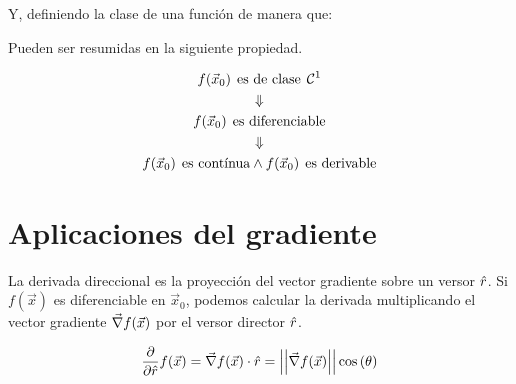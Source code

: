Y, definiendo la clase de una función de manera que:
\begin{mdframed}[style=DefinitionFrame]
    \begin{defn}
    \end{defn}
\end{mdframed}

Pueden ser resumidas en la siguiente propiedad.

\begin{mdframed}[style=PropertyFrame]
    \begin{prop}
    \end{prop}
    \begin{gather*}
        f(\Vec{x}_0) \hspace{1ex} \textrm{es de clase} \hspace{1ex} \mathcal{C}^{1}
        \\
        \Downarrow
        \\
        f(\Vec{x}_0) \hspace{1ex} \textrm{es diferenciable}
        \\
        \Downarrow
        \\
        f(\Vec{x}_0) \hspace{1ex} \textrm{es contínua}
        \land
        f(\Vec{x}_0) \hspace{1ex} \textrm{es derivable}
    \end{gather*}
\end{mdframed}


\section{Aplicaciones del gradiente}

La derivada direccional es la proyección del vector gradiente sobre un versor $\hat{r}$.
Si $f(\Vec{x})$ es diferenciable en $\Vec{x}_0$, podemos calcular la derivada multiplicando el vector gradiente $\Vec{\nabla} f(\Vec{x})$ por el versor director $\hat{r}$.

\begin{mdframed}[style=PropertyFrame]
    \begin{prop}
    \end{prop}
    \begin{equation*}
        \frac{\partial}{\partial \hat{r}} f(\Vec{x}) = \Vec{\nabla} f(\Vec{x}) \cdot \hat{r} = {\left|\left| { \Vec{\nabla} f(\Vec{x}) } \right|\right|} \cos{(\theta)}
    \end{equation*}
\end{mdframed}

